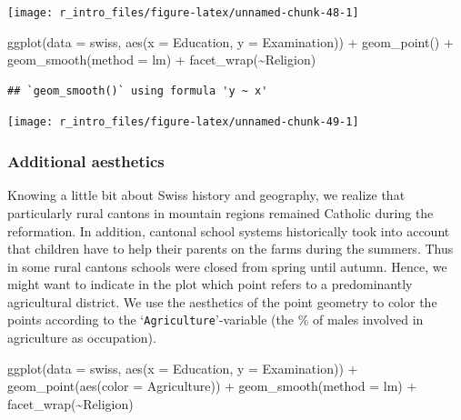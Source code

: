\documentclass[
  12pt,
]{style/krantz}
\newenvironment{Shaded}{\begin{snugshade}}{\end{snugshade}}
\newcommand{\AttributeTok}[1]{\textcolor[rgb]{0.77,0.63,0.00}{#1}}
\newcommand{\FunctionTok}[1]{\textcolor[rgb]{0.00,0.00,0.00}{#1}}
\newcommand{\NormalTok}[1]{#1}
\newcommand{\SpecialCharTok}[1]{\textcolor[rgb]{0.00,0.00,0.00}{#1}}
\newcommand{\StringTok}[1]{\textcolor[rgb]{0.31,0.60,0.02}{#1}}
\begin{document}
\texttt{[image: r\_intro\_files/figure-latex/unnamed-chunk-48-1]}

\begin{Shaded}
\begin{Highlighting}[]
\FunctionTok{ggplot}\NormalTok{(}\AttributeTok{data =}\NormalTok{ swiss, }\FunctionTok{aes}\NormalTok{(}\AttributeTok{x =}\NormalTok{ Education, }\AttributeTok{y =}\NormalTok{ Examination)) }\SpecialCharTok{+} 
     \FunctionTok{geom\_point}\NormalTok{() }\SpecialCharTok{+}
     \FunctionTok{geom\_smooth}\NormalTok{(}\AttributeTok{method =} \StringTok{\textquotesingle{}lm\textquotesingle{}}\NormalTok{) }\SpecialCharTok{+}
     \FunctionTok{facet\_wrap}\NormalTok{(}\SpecialCharTok{\textasciitilde{}}\NormalTok{Religion)}
\end{Highlighting}
\end{Shaded}

\begin{verbatim}
## `geom_smooth()` using formula 'y ~ x'
\end{verbatim}

\texttt{[image: r\_intro\_files/figure-latex/unnamed-chunk-49-1]}

\hypertarget{additional-aesthetics}{%
\subsubsection{Additional aesthetics}\label{additional-aesthetics}}

Knowing a little bit about Swiss history and geography, we realize that particularly rural cantons in mountain regions remained Catholic during the reformation. In addition, cantonal school systems historically took into account that children have to help their parents on the farms during the summers. Thus in some rural cantons schools were closed from spring until autumn. Hence, we might want to indicate in the plot which point refers to a predominantly agricultural district. We use the aesthetics of the point geometry to color the points according to the `\texttt{Agriculture}'-variable (the \% of males involved in agriculture as occupation).

\begin{Shaded}
\begin{Highlighting}[]
\FunctionTok{ggplot}\NormalTok{(}\AttributeTok{data =}\NormalTok{ swiss, }\FunctionTok{aes}\NormalTok{(}\AttributeTok{x =}\NormalTok{ Education, }\AttributeTok{y =}\NormalTok{ Examination)) }\SpecialCharTok{+} 
     \FunctionTok{geom\_point}\NormalTok{(}\FunctionTok{aes}\NormalTok{(}\AttributeTok{color =}\NormalTok{ Agriculture)) }\SpecialCharTok{+}
     \FunctionTok{geom\_smooth}\NormalTok{(}\AttributeTok{method =} \StringTok{\textquotesingle{}lm\textquotesingle{}}\NormalTok{) }\SpecialCharTok{+}
     \FunctionTok{facet\_wrap}\NormalTok{(}\SpecialCharTok{\textasciitilde{}}\NormalTok{Religion)}
\end{Highlighting}
\end{Shaded}
\end{document}
